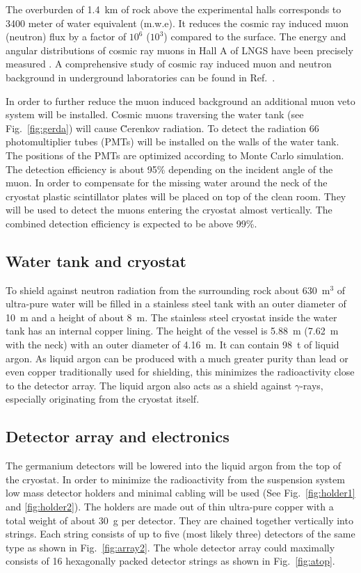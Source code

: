The overburden of 1.4~km of rock above the experimental halls corresponds to 3400 meter of water equivalent (m.w.e). It reduces the cosmic ray induced muon (neutron) flux by a factor of $10^{6}$ ($10^{3}$) compared to the surface. The energy and angular distributions of cosmic ray muons in Hall A of LNGS have been precisely measured \cite{Amb95, Lip91, Amb03}. A comprehensive study of cosmic ray induced muon and neutron background in underground laboratories can be found in Ref.~\cite{Mei06}.

In order to further reduce the muon induced background an additional muon veto system will be installed. Cosmic muons traversing the water tank (see Fig.~\ref{fig:gerda}) will cause \u{C}erenkov radiation. To detect the radiation 66 photomultiplier tubes (PMTs) will be installed on the walls of the water tank. The positions of the PMTs are optimized according to Monte Carlo simulation. The detection efficiency is about 95\% depending on the incident angle of the muon. In order to compensate for the missing water around the neck of the cryostat plastic scintillator plates will be placed on top of the clean room. They will be used to detect the muons entering the cryostat almost vertically. The combined detection efficiency is expected to be above 99\%.

\subsection{Water tank and cryostat}
\label{sec:gerda:rock}
To shield against neutron radiation from the surrounding rock about 630~m$^{3}$ of ultra-pure water will be filled in a stainless steel tank with an outer diameter of 10~m and a height of about 8~m. The stainless steel cryostat inside the water tank has an internal copper lining. The height of the vessel is 5.88~m (7.62~m with the neck) with an outer diameter of 4.16~m. It can contain 98~t of liquid argon. As liquid argon can be produced with a much greater purity than lead or even copper traditionally used for shielding, this minimizes the radioactivity close to the detector array. The liquid argon also acts as a shield against $\gamma$-rays, especially originating from the cryostat itself.

\subsection{Detector array and electronics}
\label{sec:gerda:cable}
The germanium detectors will be lowered into the liquid argon from the top of the cryostat. In order to minimize the radioactivity from the suspension system low mass detector holders and minimal cabling will be used (See Fig.~\ref{fig:holder1} and \ref{fig:holder2}). The holders are made out of thin ultra-pure copper with a total weight of about 30~g per detector. They are chained together vertically into strings. Each string consists of up to five (most likely three) detectors of the same type as shown in Fig.~\ref{fig:array2}. The whole detector array could maximally consists of 16 hexagonally packed detector strings as shown in Fig.~\ref{fig:atop}. 


